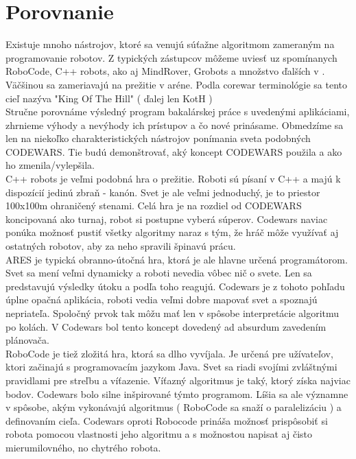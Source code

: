 \chapter{Porovnanie}
Existuje mnoho nástrojov, ktoré sa venujú súťažne algoritmom zameraným na programovanie robotov. Z typických zástupcov môžeme uviesť uz spomínanych RoboCode, C++ robots, ako aj MindRover, Grobots a množstvo ďalších v \cite{koth}. Väčšinou sa zameriavajú na prežitie v aréne. Podla corewar terminológie sa tento cieľ nazýva "King Of The Hill" ( ďalej len KotH )
\\
Stručne porovnáme výsledný program bakalárskej práce s uvedenými aplikáciami, zhrnieme výhody a nevýhody ich prístupov a čo nové prinásame. Obmedzíme sa len na niekoľko charakteristických nástrojov ponímania sveta podobných CODEWARS. Tie budú demonštrovať, aký koncept  CODEWARS použila a ako ho zmenila/vylepšila.\\

C++ robots\cite{crobots} je veľmi podobná hra o prežitie. Roboti sú písaní v C++ a majú k dispozícií jedinú zbraň - kanón. Svet je ale veľmi jednoduchý, je to priestor 100x100m ohraničený stenami.  Celá hra je na rozdiel od CODEWARS koncipovaná ako turnaj, robot si postupne vyberá súperov. %
Codewars  naviac ponúka možnosť pustiť všetky algoritmy naraz s tým, že hráč môže využívať aj ostatných  robotov, aby za neho spravili špinavú prácu. \\%

ARES\cite{ares} je typická obranno-útočná hra, ktorá je ale hlavne určená programátorom. Svet sa mení veľmi dynamicky a roboti nevedia vôbec nič o svete. Len  sa predstavujú výsledky útoku a podľa toho reagujú. Codewars je z tohoto pohľadu úplne opačná aplikácia, roboti vedia veľmi dobre mapovať svet a spoznajú nepriateľa. Spoločný prvok tak môžu mať len v spôsobe interpretácie algoritmu po kolách. V Codewars bol tento koncept dovedený ad absurdum zavedením plánovača.\\
RoboCode je tiež zložitá hra, ktorá sa dlho vyvíjala. Je určená pre užívateľov, ktori začinajú s programovacím jazykom Java. Svet sa riadi svojími zvláštnými pravidlami pre streľbu a víťazenie. Víťazný algoritmus je taký, ktorý získa najviac bodov. Codewars bolo silne inšpirované týmto programom.  Líšia sa ale významne v spôsobe, akým vykonávajú algoritmus ( RoboCode sa snaží o paralelizáciu ) a definovaním cieľa. Codewars oproti Robocode prináša možnosť prispôsobiť si robota pomocou vlastnosti jeho algoritmu a s možnostou napisat aj čisto mierumilovného, no chytrého robota.\\ %

